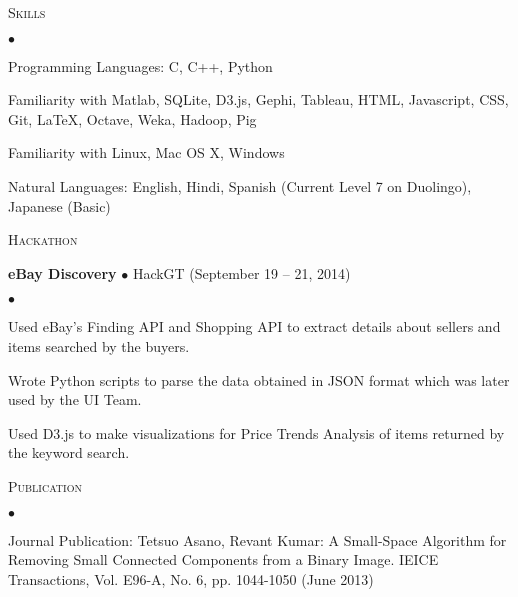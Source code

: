 \documentclass[10pt]{article}
\newcommand{\lineunder}{\\\vspace{-9pt}\hrulefill}
\newcommand{\header}[1]{{\normalsize\scshape{#1}} \lineunder}
\newcommand{\project}[3]{{ \textbf{#1} $\bullet$ #2 \hfill (#3)\\  }}
\newenvironment{achievements}{\begin{list}{$\bullet$}{\topsep 0pt \itemsep 0pt}}{\end{list}}
\begin{document}
\vspace{3pt}

\header{Skills}
\begin{achievements}
\item Programming Languages: C, C++, Python
\item Familiarity with Matlab, SQLite, D3.js, Gephi, Tableau, HTML, Javascript, CSS, Git, \LaTeX, Octave, Weka, Hadoop, Pig%
\item Familiarity with Linux, Mac OS X, Windows
\item Natural Languages: English, Hindi, Spanish (Current Level 7 on Duolingo), Japanese (Basic)
\end{achievements}
	
\vspace{3pt}

\header{Hackathon}

\project{eBay Discovery}{HackGT}{September 19 -- 21, 2014}
	\begin{achievements}
	\item Used eBay's Finding API and Shopping API to extract details about sellers and items searched by the buyers.
	\item Wrote Python scripts to parse the data obtained in JSON format which was later used by the UI Team.
	\item Used D3.js to make visualizations for Price Trends Analysis of items returned by the keyword search.
	\end{achievements}	
	
\vspace{3pt}
	
\header{Publication}%
\begin{achievements}
\item Journal Publication: Tetsuo Asano, Revant Kumar: A Small-Space Algorithm for Removing Small Connected Components from a Binary Image. IEICE Transactions, Vol. E96-A, No. 6, pp. 1044-1050 (June 2013)
\end{achievements} 
\end{document}
